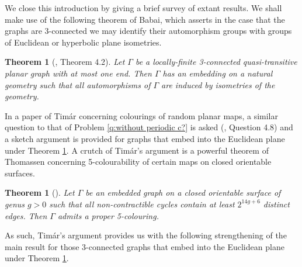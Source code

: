 \documentclass{article}
\numberwithin{equation}{section}
\newcommand{\EE}{\mathbb{E}}
\newcommand{\HH}{\mathbb{H}}
\newtheorem{theorem}[lemma]{Theorem}
\theoremstyle{definition}
\theoremstyle{remark}
\begin{document}



We close this introduction by giving a brief survey of extant results.
We shall make use of the following theorem of Babai, which asserts in the case that the graphs are 3-connected we may identify their automorphism groups with groups of Euclidean or hyperbolic plane isometries. 
\begin{theorem}[\cite{Babai97}, Theorem 4.2]\label{thm:Babai quasi-transitive}
    Let $\Gamma$ be a locally-finite 3-connected quasi-transitive planar graph with at most one end. Then $\Gamma$ has an embedding on a natural geometry such that all automorphisms of $\Gamma$ are induced by isometries of the geometry.
\end{theorem}
In a paper of Timár concerning colourings of random planar maps, a similar question to that of Problem \ref{q:without periodic c?} is asked (\cite{TIMÁR_2011}, Question 4.8) and a sketch argument is provided for graphs that embed into the Euclidean plane under Theorem \ref{thm:Babai quasi-transitive}. 
A crutch of Timár's argument is a powerful theorem of Thomassen concerning 5-colourability of certain maps on closed orientable surfaces.
\begin{theorem}[\cite{Thomassen}]\label{thm:Thomassen}
    Let $\Gamma$ be an embedded graph on a closed orientable surface of genus $g>0$ such that all non-contractible cycles contain at least $2^{14g+6}$ distinct edges. Then $\Gamma$ admits a proper 5-colouring.
\end{theorem}
As such, Timár's argument provides us with the following strengthening of the main result for those 3-connected graphs that embed into the Euclidean plane under Theorem \ref{thm:Babai quasi-transitive}.
\end{document}
